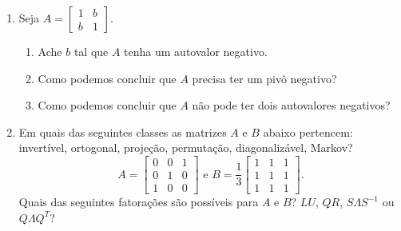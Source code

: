 \documentclass[leqno]{article}
\numberwithin{equation}{section}
\begin{document}
\maketitle

\begin{enumerate}


\item Seja $A = \begin{bmatrix}
1 & b \\
b & 1
\end{bmatrix}$.

\begin{enumerate}

\item Ache $b$ tal que $A$ tenha um autovalor negativo.

	\begin{sol} 
	\end{sol} 

\item Como podemos concluir que $A$ precisa ter um pivô negativo?

	\begin{sol} 
	\end{sol} 

\item Como podemos concluir que $A$ não pode ter dois autovalores negativos?

	\begin{sol} 
	\end{sol} 

\end{enumerate}


\item Em quais das seguintes classes as matrizes $A$ e $B$ abaixo pertencem: invertível, ortogonal, projeção, permutação, diagonalizável, Markov?
$$A = \begin{bmatrix}
0 & 0 & 1 \\
0 & 1 & 0 \\
1 & 0 & 0
\end{bmatrix} \mbox{ e } B = \frac{1}{3}\begin{bmatrix}
1 & 1 & 1 \\
1 & 1 & 1 \\
1 & 1 & 1
\end{bmatrix}.$$
Quais das seguintes fatorações são possíveis para $A$ e $B$? $LU$, $QR$, $S\Lambda S^{-1}$ ou $Q\Lambda Q^T$?


\end{enumerate}
\end{document}
